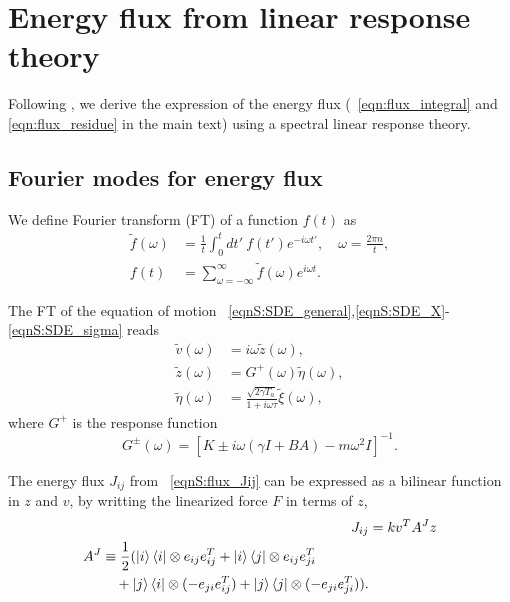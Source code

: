 \documentclass[
 amsmath,amssymb,
 aps,
 pre,
 longbibliography,
 10pt, onecolumn,
 notitlepage
]{revtex4-1}
\begin{document}
\section{Energy flux from linear response theory}
Following \cite{Kundu2011LargeDeviations}, we derive the expression of the energy flux (\eqnname~\eqref{eqn:flux_integral} and \eqref{eqn:flux_residue} in the main text) using a spectral linear response theory.

\subsection{Fourier modes for energy flux}

We define Fourier transform (FT) of a function $f(t)$ as
\begin{align}
\tilde{f}(\omega) &= \frac{1}{t} \int_0^t dt'\ f(t')e^{-i\omega t'},\quad
\omega = \frac{2\pi n}{t} ,\\
f(t) &= \sum_{\omega=-\infty}^{\infty} \tilde{f}(\omega) e^{i\omega t} .
\end{align}

The FT of the equation of motion \eqnname~\eqref{eqnS:SDE_general},\eqref{eqnS:SDE_X}-\eqref{eqnS:SDE_sigma} reads
\begin{align}
\tilde{v}(\omega) &= i\omega \tilde{z}(\omega) ,\label{eqnS:FT_v}\\
\tilde{z}(\omega) &= G^+(\omega) \tilde{\eta}(\omega) ,\label{eqnS:FT_z}\\
\tilde{\eta}(\omega) &= \frac{\sqrt{2\gamma T_a}}{1 + i\omega \tau} \tilde{\xi}(\omega) ,\label{eqnS:FT_eta}
\end{align}
where $G^+$ is the response function
\begin{equation} \label{eqnS:response}
G^{\pm}(\omega) = [K \pm i\omega(\gamma I + BA) - m\omega^2I]^{-1} .
\end{equation}

The energy flux $J_{ij}$ from \eqnname~\eqref{eqnS:flux_Jij} can be expressed as a bilinear function in $z$ and $v$, by writting the linearized force $F$ in terms of $z$,
\begin{align}
    J_{ij} &= kv^TA^{J}z \\
    \begin{split}
    A^{J} &\equiv \frac{1}{2} (\ket{i}\bra{i} \otimes e_{ij}e_{ij}^T + \ket{i}\bra{j} \otimes e_{ij}e_{ji}^T \\
    &\quad + \ket{j}\bra{i} \otimes (-e_{ji}e_{ij}^T) + \ket{j}\bra{j} \otimes (-e_{ji}e_{ji}^T)) .
    \end{split}
\end{align}
    
\end{document}
